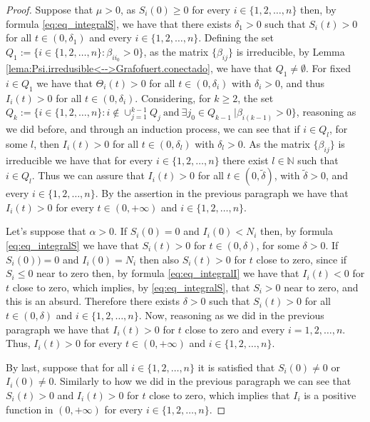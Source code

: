 \documentclass[a4paper,10pt]{article}
\theoremstyle{remark}
\begin{document}
\begin{proof}
Suppose that $\mu>0$, as $S_i(0)\geq 0$ for every $i\in\{1,2,\ldots,n\}$ then, by formula \eqref{eq:eq_integralS}, we have that there exists $\delta_1>0$ such that $S_i(t)>0$ for all $t\in (0,\delta_1)$ and every $i\in\{1,2,\ldots,n\}$.  Defining the set $Q_1:=\{i\in\{1,2,\ldots,n\}:\beta_{i i_0}>0\}$, as the matrix  $\{\beta_{ij}\}$ is  irreducible, by Lemma \ref{lema:Psi.irredusible<-->Grafofuert.conectado}, we have that $Q_1\neq \emptyset$. For fixed $i\in Q_1$ we have that $\Theta_i(t)>0$ for all $t\in (0,\delta_i)$ with $\delta_i>0$, and thus $I_i(t)>0$ for all $t\in (0,\delta_i)$.  Considering, for $k\geq 2$, the set $Q_k:=\{i\in \{1,2,\ldots,n\}: i\notin \cup_{j=1}^{k-1}Q_j\ \text{and}\ \exists j_0\in Q_{k-1}\ | \beta_{i(k-1)}>0 \}$, reasoning as we did before, and through an induction process, we can see that if  $i\in Q_l$, for some $l$, then $I_i(t)>0$  for all $t\in (0,\delta_l)$ with $\delta_l>0$. As the matrix $\{\beta_{ij}\}$ is irreducible we have that for every $i\in \{1,2,\ldots,n\}$ there exist $l\in\mathbb{N}$ such that $i\in Q_l$. Thus we can assure that $I_i(t)>0$ for all $t\in (0,\tilde{\delta})$, with $\tilde{\delta}>0$, and every $i\in \{1,2,\ldots,n\}$. By the assertion in the previous paragraph  we have that $I_i(t)>0$ for every $t\in (0,+\infty)$ and  $i\in \{1,2,\ldots,n\}$.

Let's suppose that $\alpha>0$. If $S_i(0)=0$ and $I_i(0)<N_i$ then, by formula \eqref{eq:eq_integralS} we have that $S_i(t)>0$ for $t\in (0,\delta)$, for some $\delta>0$.  If  $S_{i}(0))=0$ and $I_{i}(0)=N_i$ then also $S_i(t)>0$ for $t$ close to zero, since if  $S_i\leq 0$ near to zero then, by formula \eqref{eq:eq_integralI} we have that $I_i(t)<0$ for $t$ close to zero, which implies, by \eqref{eq:eq_integralS}, that $S_i>0$ near to zero, and this is an absurd. Therefore there exists $\delta>0$ such that $S_i(t)>0$ for all $t\in (0,\delta)$ and $i\in\{1,2,\ldots,n\}$. Now, reasoning as we did in the previous paragraph we have that $I_i(t)>0$ for $t$ close to zero and every $i=1,2,\ldots,n$. Thus, $I_i(t)>0$ for every $t\in (0,+\infty)$ and  $i\in \{1,2,\ldots,n\}$.

By last, suppose that for all $i\in\{1,2,\ldots,n\}$ it is satisfied that $S_i(0)\neq 0$ or $I_i(0)\neq 0$. Similarly to how we did in the previous paragraph we can see that $S_i(t)>0$ and $I_i(t)>0$ for $t$ close to zero, which implies that $I_i$ is a positive function in $(0,+\infty)$ for every $i\in\{1,2,\ldots,n\}$.




  




\end{proof}
\end{document}

